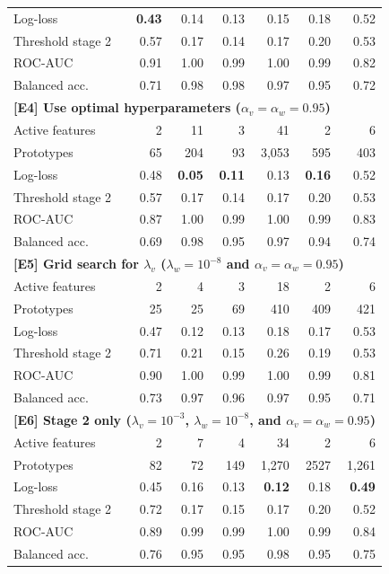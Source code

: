 \begin{table}
\begin{center}
\begin{tabular}{|lrrrrrr|}
Log-loss&\textbf{0.43}&0.14&0.13&0.15&0.18&0.52\\
Threshold stage 2&0.57&0.17&0.14&0.17&0.20&0.53\\
ROC-AUC&0.91&1.00&0.99&1.00&0.99&0.82\\
Balanced acc.&0.71&0.98&0.98&0.97&0.95&0.72\\
\multicolumn{7}{|l|}{\textbf{[E4] Use optimal hyperparameters ($\alpha_v=\alpha_w=0.95$)}}\\
Active features&2&11&3&41&2&6\\
Prototypes&65&204&93&3,053&595&403\\
Log-loss&0.48&\textbf{0.05}&\textbf{0.11}&0.13&\textbf{0.16}&0.52\\
Threshold stage 2&0.57&0.17&0.14&0.17&0.20&0.53\\
ROC-AUC&0.87&1.00&0.99&1.00&0.99&0.83\\
Balanced acc.&0.69&0.98&0.95&0.97&0.94&0.74\\
\multicolumn{7}{|l|}{\textbf{[E5] Grid search for $\lambda_v$ ($\lambda_w=10^{-8}$ and $\alpha_v=\alpha_w=0.95$)}}\\
Active features&2&4&3&18&2&6\\
Prototypes&25&25&69&410&409&421\\
Log-loss&0.47&0.12&0.13&0.18&0.17&0.53\\
Threshold stage 2&0.71&0.21&0.15&0.26&0.19&0.53\\
ROC-AUC&0.90&1.00&0.99&1.00&0.99&0.81\\
Balanced acc.&0.73&0.97&0.96&0.97&0.95&0.71\\
\multicolumn{7}{|l|}{\textbf{[E6] Stage 2 only  ($\lambda_v=10^{-3}$, $\lambda_w=10^{-8}$, and $\alpha_v=\alpha_w=0.95$)}}\\
Active features&2&7&4&34&2&6\\
Prototypes&82&72&149&1,270&2527&1,261\\
Log-loss&0.45&0.16&0.13&\textbf{0.12}&0.18&\textbf{0.49}\\
Threshold stage 2&0.72&0.17&0.15&0.17&0.20&0.52\\
ROC-AUC&0.89&0.99&0.99&1.00&0.99&0.84\\
Balanced acc.&0.76&0.95&0.95&0.98&0.95&0.75\\
\hline
\end{tabular}
\end{center}
\end{table}
%
\clearpage
%
